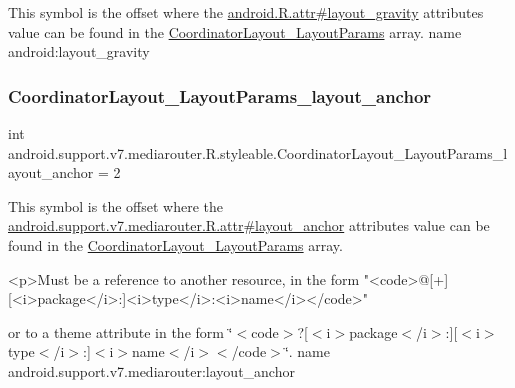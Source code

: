 This symbol is the offset where the \hyperlink{}{android.\+R.\+attr\#layout\+\_\+gravity} attribute\textquotesingle{}s value can be found in the \hyperlink{classandroid_1_1support_1_1v7_1_1mediarouter_1_1R_1_1styleable_a751aa4d9918369b542c5387a38a26624}{Coordinator\+Layout\+\_\+\+Layout\+Params} array.  name android\+:layout\+\_\+gravity \mbox{\label{classandroid_1_1support_1_1v7_1_1mediarouter_1_1R_1_1styleable_a032a1c082915d23c481db8f517cb0efe}} 
\subsubsection{\texorpdfstring{Coordinator\+Layout\+\_\+\+Layout\+Params\+\_\+layout\+\_\+anchor}{CoordinatorLayout\_LayoutParams\_layout\_anchor}}
{\footnotesize\ttfamily int android.\+support.\+v7.\+mediarouter.\+R.\+styleable.\+Coordinator\+Layout\+\_\+\+Layout\+Params\+\_\+layout\+\_\+anchor = 2\hspace{0.3cm}{\ttfamily [static]}}

This symbol is the offset where the \hyperlink{classandroid_1_1support_1_1v7_1_1mediarouter_1_1R_1_1attr_af69c1f64204816025b4664fd0a292592}{android.\+support.\+v7.\+mediarouter.\+R.\+attr\#layout\+\_\+anchor} attribute\textquotesingle{}s value can be found in the \hyperlink{classandroid_1_1support_1_1v7_1_1mediarouter_1_1R_1_1styleable_a751aa4d9918369b542c5387a38a26624}{Coordinator\+Layout\+\_\+\+Layout\+Params} array.

\begin{DoxyVerb}      <p>Must be a reference to another resource, in the form "<code>@[+][<i>package</i>:]<i>type</i>:<i>name</i></code>"
\end{DoxyVerb}
 or to a theme attribute in the form \char`\"{}$<$code$>$?\mbox{[}$<$i$>$package$<$/i$>$\+:\mbox{]}\mbox{[}$<$i$>$type$<$/i$>$\+:\mbox{]}$<$i$>$name$<$/i$>$$<$/code$>$\char`\"{}.  name android.\+support.\+v7.\+mediarouter\+:layout\+\_\+anchor \mbox{\label{classandroid_1_1support_1_1v7_1_1mediarouter_1_1R_1_1styleable_a22a95723a15dc3be9d3d0a5455654f10}} 
